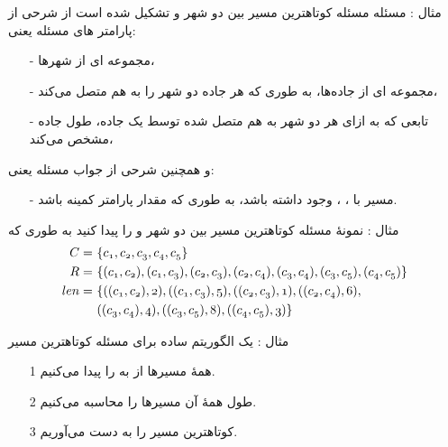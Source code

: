 \begin{frame}{مثال : مسئله}
مسئله کوتاهترین مسیر بین دو شهر
و
تشکیل شده است از شرحی از پارامتر های مسئله یعنی:
\begin{itemize}\itmsep{2mm}
\item[-]
مجموعه ای از شهرها،
\item[-]
مجموعه ای از جاده‌ها، به طوری که هر جاده دو شهر را به هم متصل می‌کند،
\item[-]
تابعی که به ازای هر دو شهر به هم متصل شده توسط یک جاده، طول جاده مشخص می‌کند،
\end{itemize}

و همچنین شرحی از جواب مسئله یعنی:
\begin{itemize}\itmsep{5mm}
\item[-]
مسیر
با
،
،
وجود داشته باشد، به طوری که
مقدار پارامتر
 کمینه باشد.

\begin{center}
\end{center}

\end{itemize}
\end{frame}

\begin{frame}{مثال : نمونهٔ مسئله}
کوتاهترین مسیر بین دو شهر
و
را پیدا کنید به طوری که
\begin{align*}
\mathnormal{C} =~& \mathnormal{ \{ c_1, c_2, c_3, c_4, c_5 \}} \\
\mathnormal{R} =~& \mathnormal{\{ (c_1, c_2), (c_1,c_3), (c_2, c_3), (c_2, c_4), (c_3, c_4), (c_3, c_5), (c_4, c_5) \}} \\
\mathnormal{len} =~& \mathnormal{\{ ((c_1, c_2),2), ((c_1,c_3),5), ((c_2, c_3),1), ((c_2, c_4),6),}  \\
~& \mathnormal{((c_3, c_4),4), ((c_3, c_5),8), ((c_4, c_5),3) \}}
\end{align*}

\begin{figure}[!ht]
  \centering
  
  \label{fig:g1}
\end{figure}

\end{frame}

\begin{frame}{مثال : یک الگوریتم ساده برای مسئله کوتاهترین مسیر}
\begin{itemize}\itmsep{2mm}
\item[1] همهٔ مسیرها از 
به
را پیدا می‌کنیم.
\item[2]
طول همهٔ آن مسیرها را محاسبه می‌کنیم.
\item[3]
کوتاهترین مسیر را به دست می‌آوریم.
\end{itemize}
\end{frame}

